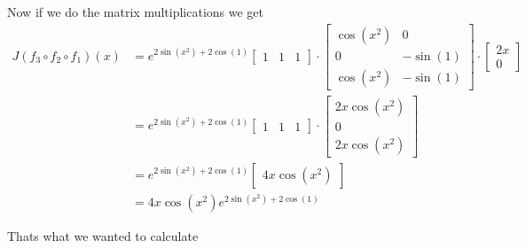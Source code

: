 \documentclass{article}
\begin{document}
Now if we do the matrix multiplications we get
\begin{align*}
   J(f_3 \circ f_2 \circ f_1)(x) &= e^{2\sin(x^2) + 2\cos(1)} \begin{bmatrix}
      1 & 1 & 1
   \end{bmatrix} \cdot \begin{bmatrix}
      \cos(x^2) & 0 \\
      0 & -\sin(1) \\
      \cos(x^2) & -\sin(1)
   \end{bmatrix} \cdot \begin{bmatrix}
      2x \\
      0
   \end{bmatrix} \\
   &= e^{2\sin(x^2) + 2\cos(1)} \begin{bmatrix}
      1 & 1 & 1
   \end{bmatrix} \cdot \begin{bmatrix}
      2x \cos(x^2) \\
      0 \\
      2x \cos(x^2)
   \end{bmatrix} \\
   &= e^{2\sin(x^2) + 2\cos(1)} \begin{bmatrix}
      4x \cos(x^2)
   \end{bmatrix} \\
   &= 4x \cos(x^2) e^{2\sin(x^2) + 2\cos(1)}
\end{align*}

Thats what we wanted to calculate
\end{document}

